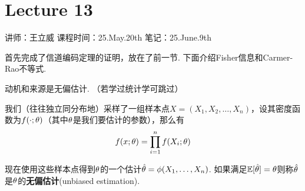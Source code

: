 \chapter{Lecture 13}

\begin{center}
    讲师：王立威 \qquad
    课程时间：25.May.20th \qquad 
    笔记：25.June.9th
\end{center}

\bigskip

首先完成了信道编码定理的证明，放在了前一节. 下面介绍Fisher信息和Carmer-Rao不等式. 

动机和来源是无偏估计. （若学过统计学可跳过）
\begin{definition}[无偏估计]
    我们（往往独立同分布地）采样了一组样本点$X=(X_1,X_2,\dots, X_n)$，设其密度函数为$f(\cdot;\theta)$（其中$\theta$是我们要估计的参数），那么有 
    \[
    f(x;\theta) = \prod_{i=1}^n f(X_i; \theta)
    \]
    
    现在使用这些样本点得到$\theta$的一个估计$\hat{\theta} = \phi(X_1,\dots, X_n)$. 如果满足$\mathbb{E}[\hat{\theta}] = \theta$则称$\hat{\theta}$是$\theta$的\textbf{无偏估计}(unbiased estimation).
\end{definition}


